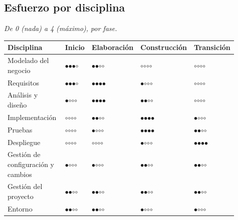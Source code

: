 \documentclass[11pt,a4paper]{article}
\begin{document}
\subsection*{Esfuerzo por disciplina}

\emph{De 0 (nada) a 4 (máximo), por fase.}

{\footnotesize\setlength{\tabcolsep}{4pt}
\begin{longtable}{@{}>{\raggedright\arraybackslash}p{0.389\linewidth}>{\raggedright\arraybackslash}p{0.079\linewidth}>{\raggedright\arraybackslash}p{0.147\linewidth}>{\raggedright\arraybackslash}p{0.166\linewidth}>{\raggedright\arraybackslash}p{0.133\linewidth}@{}}
\toprule
\textbf{Disciplina} & \textbf{Inicio} & \textbf{Elaboración} & \textbf{Construcción} & \textbf{Transición} \\
\midrule
\endhead
Modelado del negocio & $\bullet$$\bullet$$\bullet$$\circ$ & $\bullet$$\bullet$$\circ$$\circ$ & $\circ$$\circ$$\circ$$\circ$ & $\circ$$\circ$$\circ$$\circ$ \\
Requisitos & $\bullet$$\bullet$$\bullet$$\circ$ & $\bullet$$\bullet$$\bullet$$\bullet$ & $\bullet$$\circ$$\circ$$\circ$ & $\circ$$\circ$$\circ$$\circ$ \\
Análisis y diseño & $\bullet$$\circ$$\circ$$\circ$ & $\bullet$$\bullet$$\bullet$$\bullet$ & $\bullet$$\bullet$$\circ$$\circ$ & $\circ$$\circ$$\circ$$\circ$ \\
Implementación & $\circ$$\circ$$\circ$$\circ$ & $\bullet$$\bullet$$\circ$$\circ$ & $\bullet$$\bullet$$\bullet$$\bullet$ & $\bullet$$\circ$$\circ$$\circ$ \\
Pruebas & $\circ$$\circ$$\circ$$\circ$ & $\bullet$$\circ$$\circ$$\circ$ & $\bullet$$\bullet$$\bullet$$\bullet$ & $\bullet$$\bullet$$\circ$$\circ$ \\
Despliegue & $\circ$$\circ$$\circ$$\circ$ & $\circ$$\circ$$\circ$$\circ$ & $\bullet$$\circ$$\circ$$\circ$ & $\bullet$$\bullet$$\bullet$$\bullet$ \\
Gestión de configuración y cambios & $\bullet$$\circ$$\circ$$\circ$ & $\bullet$$\circ$$\circ$$\circ$ & $\bullet$$\bullet$$\circ$$\circ$ & $\bullet$$\bullet$$\circ$$\circ$ \\
Gestión del proyecto & $\bullet$$\bullet$$\circ$$\circ$ & $\bullet$$\bullet$$\circ$$\circ$ & $\bullet$$\bullet$$\circ$$\circ$ & $\bullet$$\bullet$$\circ$$\circ$ \\
Entorno & $\bullet$$\bullet$$\circ$$\circ$ & $\bullet$$\bullet$$\circ$$\circ$ & $\bullet$$\circ$$\circ$$\circ$ & $\bullet$$\circ$$\circ$$\circ$ \\
\bottomrule
\end{longtable}}
\end{document}
